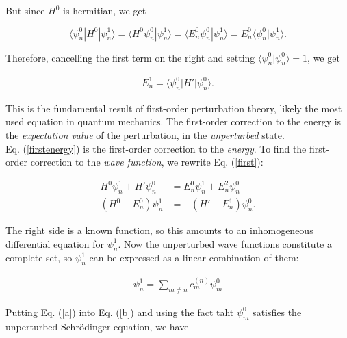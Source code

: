 \documentclass[svgnames]{article}     %
\begin{document}
But since $H^0$ is hermitian, we get 

\[
\langle \psi_n^0 | H^0 | \psi_n^1\rangle = \langle H^0 \psi_n^0 | \psi_n^1
\rangle = \langle E_n^0\psi_n^0 | \psi_n^1\rangle = E_n^0\langle \psi_n^0
| \psi_n^1 \rangle. 
\] \vspace{3px}

Therefore, cancelling the first term on the right and setting $\langle \psi_n^0
| \psi_n^0 \rangle = 1$, we get 

\vspace{3px}
\begin{tcolorbox}[colback = red!5!white, colframe = red!50!black, title = First
  Order Correction to Energy]

  \begin{align}\label{firstenergy} E_n^1 = \langle \psi_n^0 | H' | \psi_n^0
  \rangle. \end{align}

\end{tcolorbox}
\vspace{3px}

This is the fundamental result of first-order perturbation theory, likely the
most used equation in quantum mechanics. The first-order correction to the
energy is the \textit{expectation value} of the perturbation, in the
\textit{unperturbed} state. \\


Eq. (\ref{firstenergy}) is the first-order correction to the \textit{energy}.
To find the first-order correction to the \textit{wave function}, we rewrite
Eq. (\ref{first}): 

\begin{align} \label{b}
  H^0\psi_n^1 + H'\psi_n^0 &= E_n^0\psi_n^1 + E_n^2\psi_n^0 \nonumber \\ 
  \left(H^0 - E_n^0\right) \psi_n^1 &= - \left( H' - E_n^1 \right) \psi_n^0. 
\end{align}

The right side is a known function, so this amounts to an inhomogeneous
differential equation for $\psi_n^1$. Now the unperturbed wave functions
constitute a complete set, so $\psi_n^1$ can be expressed as a linear
combination of them: 

\begin{align} \label{a}
  \psi_n^1 = \sum_{m\neq n}^{} c_m^{(n)} \psi_m^0
\end{align}\vspace{3px}

Putting Eq. (\ref{a}) into Eq. (\ref{b}) and using the fact taht $\psi_m^0$
satisfies the unperturbed Schr\"odinger equation, we have 
\end{document}
